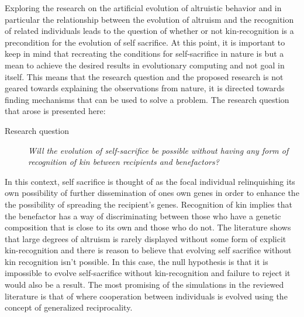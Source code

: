 \documentclass[a4paper]{book}
\begin{document}
Exploring the research on the artificial evolution of altruistic behavior and in particular the relationship between the evolution of altruism and the recognition of related individuals leads to the question of whether or not kin-recognition is a precondition for the evolution of self sacrifice. At this point, it is important to keep in mind that recreating the conditions for self-sacrifice in nature is but a mean to achieve the desired results in evolutionary computing and not goal in itself. This means that the research question and the proposed research is not geared towards explaining the observations from nature, it is directed towards finding mechanisms that can be used to solve a problem.
The research question that arose is presented here:
\begin{description}
\item[Research question] {\it Will the evolution of self-sacrifice be possible without having any form of recognition of
    kin between recipients and benefactors?}
\end{description}

In this context, self sacrifice is thought of as the focal individual relinquishing its own possibility of further dissemination of ones own genes in order to enhance the the possibility of spreading the recipient's genes.
Recognition of kin implies that the benefactor has a way of discriminating between those who have a genetic composition that is close to its own and those who do not.
The literature shows that large degrees of altruism is rarely displayed without some form of explicit kin-recognition and there is reason to believe that evolving self sacrifice without kin recognition isn't possible. 
In this case, the null hypothesis is that it is impossible to evolve self-sacrifice without kin-recognition and failure to reject it would also be a result. 
The most promising of the simulations in the reviewed literature is that of \cite{barta_cooperation_2010} where cooperation between individuals is evolved using the concept of generalized reciprocality.  

\end{document}
